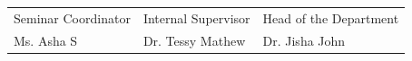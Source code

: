 


\begin{table}[htbp]
    \centering
    \renewcommand{\arraystretch}{1.5}
    \begin{tabular*}{\textwidth}{@{\extracolsep{\fill}}lll}
        Seminar Coordinator & Internal Supervisor & Head of the Department \\
        Ms. Asha S & Dr. Tessy Mathew & Dr. Jisha John \\
    \end{tabular*}
\end{table}  